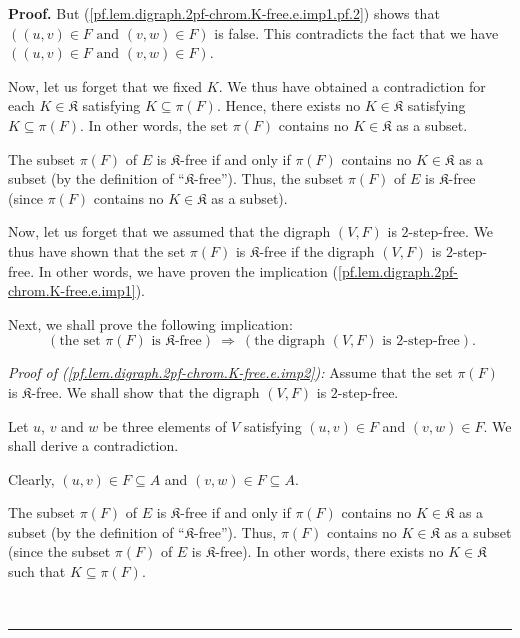 \documentclass[numbers=enddot,12pt,final,onecolumn,notitlepage]{scrartcl}%
\theoremstyle{definition}
\newenvironment{proof}[1][Proof]{\noindent\textbf{#1.} }{\ \rule{0.5em}{0.5em}}
\newenvironment{verlong}{}{}
\begin{document}
\begin{verlong}
\begin{proof}
But (\ref{pf.lem.digraph.2pf-chrom.K-free.e.imp1.pf.2}) shows that $\left(
\left(  u,v\right)  \in F\text{ and }\left(  v,w\right)  \in F\right)  $ is
false. This contradicts the fact that we have $\left(  \left(  u,v\right)  \in
F\text{ and }\left(  v,w\right)  \in F\right)  $.

Now, let us forget that we fixed $K$. We thus have obtained a contradiction
for each $K\in\mathfrak{K}$ satisfying $K\subseteq\pi\left(  F\right)  $.
Hence, there exists no $K\in\mathfrak{K}$ satisfying $K\subseteq\pi\left(
F\right)  $. In other words, the set $\pi\left(  F\right)  $ contains no
$K\in\mathfrak{K}$ as a subset.

The subset $\pi\left(  F\right)  $ of $E$ is $\mathfrak{K}$-free if and only
if $\pi\left(  F\right)  $ contains no $K\in\mathfrak{K}$ as a subset (by the
definition of \textquotedblleft$\mathfrak{K}$-free\textquotedblright). Thus,
the subset $\pi\left(  F\right)  $ of $E$ is $\mathfrak{K}$-free (since
$\pi\left(  F\right)  $ contains no $K\in\mathfrak{K}$ as a subset).

Now, let us forget that we assumed that the digraph $\left(  V,F\right)  $ is
$2$-step-free. We thus have shown that the set $\pi\left(  F\right)  $ is
$\mathfrak{K}$-free if the digraph $\left(  V,F\right)  $ is $2$-step-free. In
other words, we have proven the implication
(\ref{pf.lem.digraph.2pf-chrom.K-free.e.imp1}).

Next, we shall prove the following implication:%
\begin{equation}
\ \left(  \text{the set }\pi\left(  F\right)  \text{ is }\mathfrak{K}%
\text{-free}\right)  \ \Longrightarrow\ \left(  \text{the digraph }\left(
V,F\right)  \text{ is }2\text{-step-free}\right)  .
\label{pf.lem.digraph.2pf-chrom.K-free.e.imp2}%
\end{equation}


\textit{Proof of (\ref{pf.lem.digraph.2pf-chrom.K-free.e.imp2}):} Assume that
the set $\pi\left(  F\right)  $ is $\mathfrak{K}$-free. We shall show that the
digraph $\left(  V,F\right)  $ is $2$-step-free.

Let $u$, $v$ and $w$ be three elements of $V$ satisfying $\left(  u,v\right)
\in F$ and $\left(  v,w\right)  \in F$. We shall derive a contradiction.

Clearly, $\left(  u,v\right)  \in F\subseteq A$ and $\left(  v,w\right)  \in
F\subseteq A$.

The subset $\pi\left(  F\right)  $ of $E$ is $\mathfrak{K}$-free if and only
if $\pi\left(  F\right)  $ contains no $K\in\mathfrak{K}$ as a subset (by the
definition of \textquotedblleft$\mathfrak{K}$-free\textquotedblright). Thus,
$\pi\left(  F\right)  $ contains no $K\in\mathfrak{K}$ as a subset (since the
subset $\pi\left(  F\right)  $ of $E$ is $\mathfrak{K}$-free). In other words,
there exists no $K\in\mathfrak{K}$ such that $K\subseteq\pi\left(  F\right)  $.


\end{proof}
\end{verlong}
\end{document}
